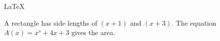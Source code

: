 \documentclass[11pt]{article}
\begin{document}
\LaTeX\

A rectangle has side lengths of $(x+1)$ and $(x+3)$.
The equation $A(x)=x^s+4x+3$ gives the area.
\end{document}
